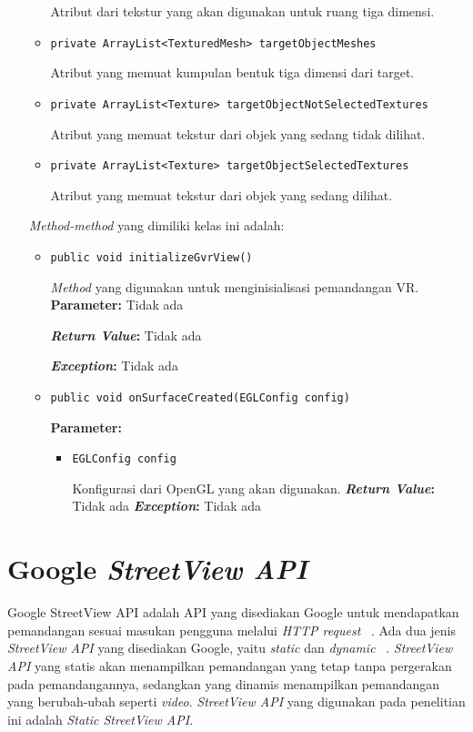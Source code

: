 \begin{enumerate}
\begin{itemize}
  		Atribut dari tekstur yang akan digunakan untuk ruang tiga dimensi.
  		\item \texttt{private ArrayList<TexturedMesh> targetObjectMeshes}
  		
  		Atribut yang memuat kumpulan bentuk tiga dimensi dari target.
  		\item \texttt{private ArrayList<Texture> targetObjectNotSelectedTextures}
  		
  		
  		Atribut yang memuat tekstur dari objek yang sedang tidak dilihat.
  		\item \texttt{private ArrayList<Texture> targetObjectSelectedTextures}
  		
  		Atribut yang memuat tekstur dari objek yang sedang dilihat.
	\end{itemize}
	
	\textit{Method-method} yang dimiliki kelas ini adalah:
	
	\begin{itemize}
		\item \texttt{public void initializeGvrView()}
		
		\textit{Method} yang digunakan untuk menginisialisasi pemandangan VR.
		\textbf{Parameter:} Tidak ada
		
		\textbf{\textit{Return Value}:} Tidak ada
		
		\textbf{\textit{Exception}:} Tidak ada		
		
		\item \texttt{public void onSurfaceCreated(EGLConfig config)}
		
		\textbf{Parameter:}
			\begin{itemize}
			\item \texttt{EGLConfig config}
			
		Konfigurasi dari OpenGL yang akan digunakan.
		\textbf{\textit{Return Value}:} Tidak ada
		\textbf{\textit{Exception}:} Tidak ada		
					
			
			\end{itemize}					

	\end{itemize}
	
\end{enumerate}

\section{Google \it{StreetView API}}
\label{sec:streetview}
Google StreetView API adalah API yang disediakan Google untuk mendapatkan pemandangan sesuai masukan pengguna melalui \textit{HTTP request} ~\cite{streetview-api}. Ada dua jenis {\it StreetView API} yang disediakan Google, yaitu {\it static} dan {\it dynamic} ~\cite{streetview-api}. {\it StreetView API} yang statis akan menampilkan pemandangan yang tetap tanpa pergerakan pada pemandangannya, sedangkan yang dinamis menampilkan pemandangan yang berubah-ubah seperti {\it video}. {\it StreetView API} yang digunakan pada penelitian ini adalah {\it Static StreetView API}.

